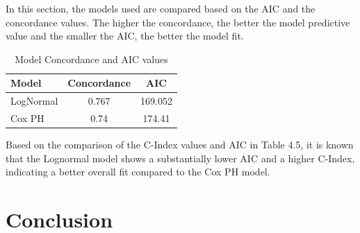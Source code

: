 \documentclass[doublespacing]{report} %
\begin{document}
In this section, the models used are compared based on the AIC and the concordance values. The higher the concordance, the better the model predictive value and the smaller the AIC, the better the model fit.

	\begin{table}[H]
			\centering
			\begin{tabular}{lcc}
				\toprule
				\textbf{Model} & \textbf{Concordance} & \textbf{AIC} \\
				\midrule
				LogNormal& 0.767& 169.052\\
				Cox PH & 0.74& 174.41\\
				\bottomrule
			\end{tabular}
			\caption{Model Concordance and AIC values}
			\label{Table 2}
			
		\end{table}

Based on the comparison of the C-Index values and AIC in Table 4.5, it is known that the Lognormal model shows a substantially lower AIC  and a higher C-Index, indicating a better overall fit compared to the Cox PH model. 

\newpage
\chapter{Conclusion}
\end{document}
